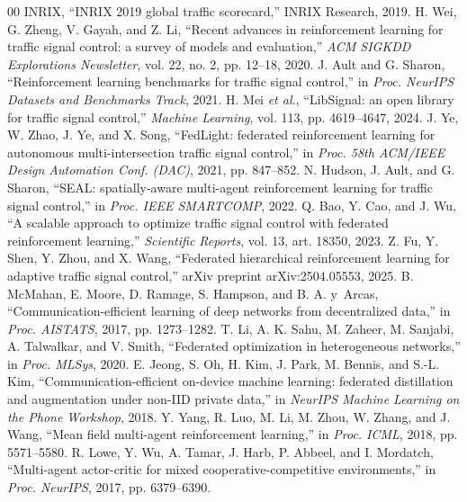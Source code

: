 \documentclass[conference]{IEEEtran}
\begin{document}
\begin{thebibliography}{00}
 INRIX, ``INRIX 2019 global traffic scorecard,'' INRIX Research, 2019.
 H. Wei, G. Zheng, V. Gayah, and Z. Li, ``Recent advances in reinforcement learning for traffic signal control: a survey of models and evaluation,'' \textit{ACM SIGKDD Explorations Newsletter}, vol. 22, no. 2, pp. 12--18, 2020.
 J. Ault and G. Sharon, ``Reinforcement learning benchmarks for traffic signal control,'' in \textit{Proc. NeurIPS Datasets and Benchmarks Track}, 2021.
 H. Mei \textit{et al.}, ``LibSignal: an open library for traffic signal control,'' \textit{Machine Learning}, vol. 113, pp. 4619--4647, 2024.
 J. Ye, W. Zhao, J. Ye, and X. Song, ``FedLight: federated reinforcement learning for autonomous multi-intersection traffic signal control,'' in \textit{Proc. 58th ACM/IEEE Design Automation Conf. (DAC)}, 2021, pp. 847--852.
 N. Hudson, J. Ault, and G. Sharon, ``SEAL: spatially-aware multi-agent reinforcement learning for traffic signal control,'' in \textit{Proc. IEEE SMARTCOMP}, 2022.
 Q. Bao, Y. Cao, and J. Wu, ``A scalable approach to optimize traffic signal control with federated reinforcement learning,'' \textit{Scientific Reports}, vol. 13, art. 18350, 2023.
 Z. Fu, Y. Shen, Y. Zhou, and X. Wang, ``Federated hierarchical reinforcement learning for adaptive traffic signal control,'' arXiv preprint arXiv:2504.05553, 2025.
 B. McMahan, E. Moore, D. Ramage, S. Hampson, and B. A. y~Arcas, ``Communication-efficient learning of deep networks from decentralized data,'' in \textit{Proc. AISTATS}, 2017, pp. 1273--1282.
 T. Li, A. K. Sahu, M. Zaheer, M. Sanjabi, A. Talwalkar, and V. Smith, ``Federated optimization in heterogeneous networks,'' in \textit{Proc. MLSys}, 2020.
 E. Jeong, S. Oh, H. Kim, J. Park, M. Bennis, and S.-L. Kim, ``Communication-efficient on-device machine learning: federated distillation and augmentation under non-IID private data,'' in \textit{NeurIPS Machine Learning on the Phone Workshop}, 2018.
 Y. Yang, R. Luo, M. Li, M. Zhou, W. Zhang, and J. Wang, ``Mean field multi-agent reinforcement learning,'' in \textit{Proc. ICML}, 2018, pp. 5571--5580.
 R. Lowe, Y. Wu, A. Tamar, J. Harb, P. Abbeel, and I. Mordatch, ``Multi-agent actor-critic for mixed cooperative-competitive environments,'' in \textit{Proc. NeurIPS}, 2017, pp. 6379--6390.

\end{thebibliography}
\end{document}

